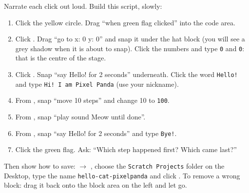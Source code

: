 \begin{workedexample}
Narrate each click out loud. Build this script, slowly:
\par\noindent\begin{minipage}[t]{0.56\linewidth}
\begin{enumerate}[leftmargin=1.4em,itemsep=1pt]
  \item Click the yellow  circle. Drag \enquote{when green flag clicked} into the code area.
  \item Click . Drag \enquote{go to x: 0 y: 0} and snap it under the hat block (you will see a grey shadow when it is about to snap). Click the numbers and type \texttt{0} and \texttt{0}: that is the centre of the stage.
  \item Click . Snap \enquote{say Hello! for 2 seconds} underneath. Click the word \texttt{Hello!} and type \texttt{Hi! I am Pixel Panda} (use your nickname).
  \item From , snap \enquote{move 10 steps} and change 10 to \texttt{100}.
  \item From , snap \enquote{play sound Meow until done}.
  \item From , snap \enquote{say Hello! for 2 seconds} and type \texttt{Bye!}.
  \item Click the green flag. Ask: \enquote{Which step happened first? Which came last?}
\end{enumerate}
\end{minipage}\hfill
\begin{minipage}[t]{0.40\linewidth}\vspace{4pt}\centering
\begin{scratch}[scale=0.68]
\end{scratch}
\end{minipage}

Then show how to save:  $\rightarrow$ , choose the \texttt{Scratch Projects} folder on the Desktop, type the name \texttt{hello-cat-pixelpanda} and click . To remove a wrong block: drag it back onto the block area on the left and let go.
\end{workedexample}

